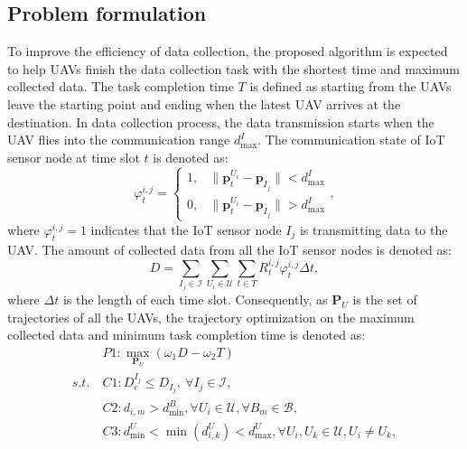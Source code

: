 \documentclass[conference]{IEEEtran}
\begin{document}
\subsection{Problem formulation}\label{optimization_prob}
To improve the efficiency of data collection, the proposed algorithm is expected to help UAVs finish the data collection task with the shortest time and maximum collected data. 
The task completion time $T$ is defined as starting from the UAVs leave the starting point and ending when the latest UAV arrives at the destination. In data collection process, the data transmission starts when the UAV flies into the communication range $d_{\max}^{I}$. The communication state of IoT sensor node at time slot $t$ is denoted as: 
\begin{equation}\label{data_collection_state}
  \varphi^{i,j}_t=
  \begin{cases}
            1, & \mbox{$\lVert \mathbf{p}_t^{U_i}-\mathbf{p}_{I_j} \rVert < d_{\max}^{I}$}\\
            0, & \mbox{$\lVert \mathbf{p}_t^{U_i}-\mathbf{p}_{I_j} \rVert > d_{\max}^{I}$}
\end{cases},
\end{equation}
where $\varphi^{i,j}_t=1$ indicates that the IoT sensor node $I_j$ is transmitting data to the UAV. 
The amount of collected data from all the IoT sensor nodes is denoted as: 
\begin{equation}\label{collected_data}
  D=\sum_{I_j\in \mathcal{I}}\sum_{U_i\in \mathcal{U}}{\sum_{t\in T}{R^{i,j}_t \varphi^{i,j}_t \Delta t}},
\end{equation}
where $\Delta t$ is the length of each time slot. 
Consequently, as $\mathbf{P}_U$ is the set of trajectories of all the UAVs, the trajectory optimization on the maximum collected data and minimum task completion time is denoted as: 
\begin{align}
    &P1: \max\limits_{\mathbf{P}_U}\left({\omega_1 D - \omega_2 T}\right)\label{optim_prob1}\\
  s.t.\:& C1: D^{I_j}_{c}\leq D_{I_j},\: \forall I_j\in\mathcal{I}, \nonumber \\
        & C2: d_{i,m} > d_{\min}^{B}, \forall U_i \in \mathcal{U}, \forall B_m \in \mathcal{B}, \nonumber \\
        & C3: d^{U}_{\min} < \min\left(d^{U}_{i,k}\right) < d^{U}_{\max}, \forall U_i, U_k \in \mathcal{U}, U_i \neq U_k, \nonumber 
\end{align}
\end{document}
